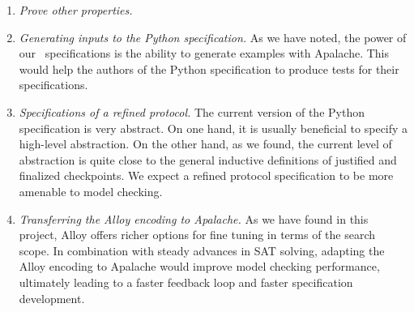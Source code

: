 
\begin{enumerate}

  \item \emph{Prove other properties.}

  \item \emph{Generating inputs to the Python specification.} As we have noted,
    the power of our~\tlap{} specifications is the ability to generate examples
    with Apalache. This would help the authors of the Python specification to
    produce tests for their specifications.

  \item \emph{Specifications of a refined protocol.} The current version of the
    Python specification is very abstract. On one hand, it is usually
    beneficial to specify a high-level abstraction. On the other hand, as we
    found, the current level of abstraction is quite close to the general
    inductive definitions of justified and finalized checkpoints. We expect a
    refined protocol specification to be more amenable to model checking.

  \item \emph{Transferring the Alloy encoding to Apalache.} As we have found in
    this project, Alloy offers richer options for fine tuning in terms of the
    search scope. In combination with steady advances in SAT solving, adapting
    the Alloy encoding to Apalache would improve model checking performance,
    ultimately leading to a faster feedback loop and faster specification
    development.

\end{enumerate}

